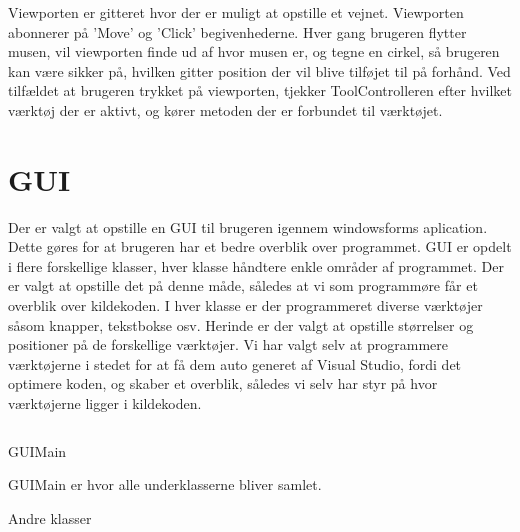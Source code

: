 \vspace{5mm}

Viewporten er gitteret hvor der er muligt at opstille et vejnet. Viewporten abonnerer på 'Move' og 'Click' begivenhederne. Hver gang brugeren flytter musen, vil viewporten finde ud af hvor musen er, og tegne en cirkel, så brugeren kan være sikker på, hvilken gitter position der vil blive tilføjet til på forhånd. Ved tilfældet at brugeren trykket på viewporten, tjekker ToolControlleren efter hvilket værktøj der er aktivt, og kører metoden der er forbundet til værktøjet.

\vspace{5mm}

\section{GUI}
Der er valgt at opstille en GUI til brugeren igennem windowsforms aplication.
Dette gøres for at brugeren har et bedre overblik over programmet.
GUI er opdelt i flere forskellige klasser, hver klasse håndtere enkle områder af programmet.
Der er valgt at opstille det på denne måde, således at vi som programmøre får et overblik over kildekoden.
I hver klasse er der programmeret diverse værktøjer såsom knapper, tekstbokse osv.
Herinde er der valgt at opstille størrelser og positioner på de forskellige værktøjer.
Vi har valgt selv at programmere værktøjerne i stedet for at få dem auto generet af Visual Studio,
fordi det optimere koden, og skaber et overblik, således vi selv har styr på hvor værktøjerne ligger i kildekoden.

\begin {lstlisting}
\end {lstlisting}

GUIMain

GUIMain er hvor alle underklasserne bliver samlet.

Andre klasser